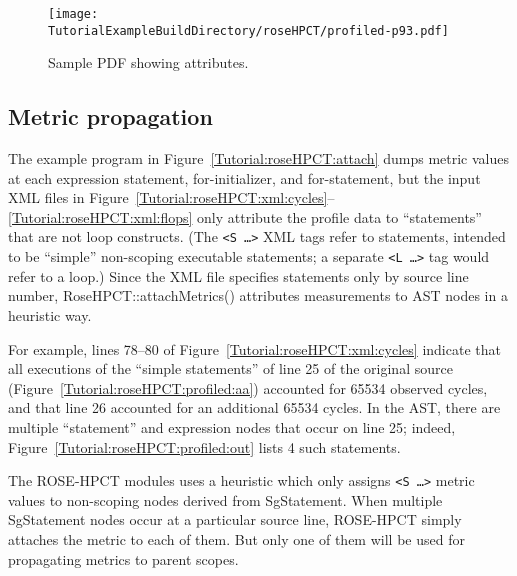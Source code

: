 \begin{figure}[!hb]
\texttt{[image: \\TutorialExampleBuildDirectory/roseHPCT/profiled-p93.pdf]}
\caption{Sample PDF showing attributes.}
\label{Tutorial:roseHPCT:pdf}
\end{figure}

\subsection{Metric propagation}
\label{sec:rosehpct:metprop}

The example program in Figure~\ref{Tutorial:roseHPCT:attach} dumps
metric values at each expression statement, for-initializer, and
for-statement, but the input XML files in
Figure~\ref{Tutorial:roseHPCT:xml:cycles}--\ref{Tutorial:roseHPCT:xml:flops}
only attribute the profile data to ``statements'' that are not loop
constructs. (The \texttt{<S \ldots>} XML tags refer to statements,
intended to be ``simple'' non-scoping executable statements; a
separate \texttt{<L \ldots>} tag would refer to a loop.) Since the XML
file specifies statements only by source line number,
RoseHPCT::attachMetrics() attributes measurements to AST nodes in a
heuristic way.

For example, lines 78--80 of Figure~\ref{Tutorial:roseHPCT:xml:cycles}
indicate that all executions of the ``simple statements'' of line 25
of the original source (Figure~\ref{Tutorial:roseHPCT:profiled:aa})
accounted for 65534 observed cycles, and that line 26 accounted for an
additional 65534 cycles. In the AST, there are multiple ``statement''
and expression nodes that occur on line 25; indeed,
Figure~\ref{Tutorial:roseHPCT:profiled:out} lists 4 such
statements.

The ROSE-HPCT modules uses a heuristic which only assigns \texttt{<S
\ldots>} metric values to non-scoping nodes derived from
SgStatement. When multiple SgStatement nodes occur at a particular
source line, 
ROSE-HPCT simply attaches the metric to each of them. 
But only one of them will be used for propagating metrics to parent scopes.

